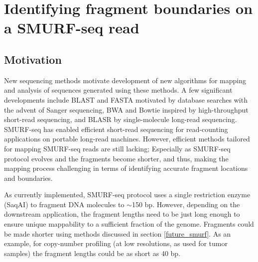 \chapter{Identifying fragment boundaries on a SMURF-seq read}
\label{ch4}

\section{Motivation}
New sequencing methods motivate development of new algorithms for
mapping and analysis of sequences generated using these methods. A few
significant developments include BLAST \citep{altschul1990basic} and
FASTA \citep{pearson1988improved} motivated by database searches with
the advent of Sanger sequencing, BWA \citep{li2009fast} and Bowtie
\citep{langmead2009ultrafast} inspired by high-throughput short-read
sequencing, and BLASR \citep{chaisson2012mapping} by single-molecule
long-read sequencing.
SMURF-seq has enabled efficient short-read sequencing for read-counting
applications on portable long-read machines.  However, efficient methods
tailored for mapping SMURF-seq reads are still lacking; Especially as
SMURF-seq protocol evolves and the fragments become shorter, and thus,
making the mapping process challenging in terms of identifying accurate
fragment locations and boundaries.

As currently implemented, SMURF-seq protocol uses a single restriction
enzyme (SaqAI) to fragment DNA molecules to $\sim$150 bp. However,
depending on the downstream application, the fragment lengths need to be
just long enough to ensure unique mappability to a sufficient fraction
of the genome.
Fragments could be made shorter using methods discussed in section
\ref{future_smurf}.  As an example, for copy-number profiling (at low
resolutions, as used for tumor samples) the fragment lengths could be as
short as 40 bp.


